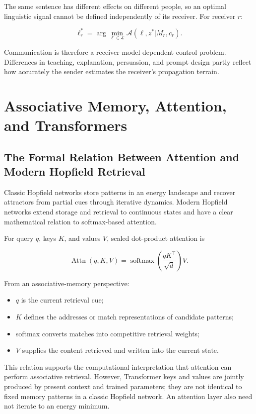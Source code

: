 \documentclass[11pt, a4paper]{article}
\begin{document}
The same sentence has different effects on different people, so an optimal linguistic signal cannot be defined independently of its receiver. For receiver $r$:


\[
\ell_r^*
=
\arg\min_{\ell\in\mathcal{L}}
\mathcal{A}(\ell,z^*|M_r,c_r).
\tag{9}
\]

Communication is therefore a receiver-model-dependent control problem. Differences in teaching, explanation, persuasion, and prompt design partly reflect how accurately the sender estimates the receiver's propagation terrain.



\section{Associative Memory, Attention, and Transformers}


\subsection{The Formal Relation Between Attention and Modern Hopfield Retrieval}


Classic Hopfield networks store patterns in an energy landscape and recover attractors from partial cues through iterative dynamics. Modern Hopfield networks extend storage and retrieval to continuous states and have a clear mathematical relation to softmax-based attention.


For query $q$, keys $K$, and values $V$, scaled dot-product attention is


\[
\operatorname{Attn}(q,K,V)
=
\operatorname{softmax}
\left(
\frac{qK^\top}{\sqrt d}
\right)V.
\tag{10}
\]

From an associative-memory perspective:


\begin{itemize}
\item $q$ is the current retrieval cue;
\item $K$ defines the addresses or match representations of candidate patterns;
\item softmax converts matches into competitive retrieval weights;
\item $V$ supplies the content retrieved and written into the current state.
\end{itemize}


This relation supports the computational interpretation that attention can perform associative retrieval. However, Transformer keys and values are jointly produced by present context and trained parameters; they are not identical to fixed memory patterns in a classic Hopfield network. An attention layer also need not iterate to an energy minimum.
\end{document}
